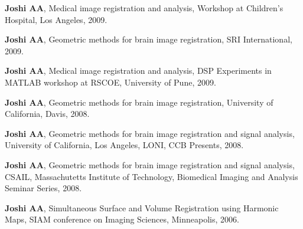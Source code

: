 \documentclass[overlapped,line,letterpaper]{res}
\begin{document}
\begin{resume}
\textbf{Joshi AA}, Medical image registration and analysis, Workshop at Children's Hospital, Los Angeles, 2009.

\textbf{Joshi AA}, Geometric methods for brain image registration, SRI International, 2009. 

\textbf{Joshi AA}, Medical image registration and analysis, DSP Experiments in MATLAB workshop at RSCOE, University of Pune, 2009.

\textbf{Joshi AA}, Geometric methods for brain image registration, University of California, Davis, 2008.

\textbf{Joshi AA}, Geometric methods for brain image registration and signal analysis, University of California, Los Angeles, LONI, CCB Presents, 2008.

\textbf{Joshi AA}, Geometric methods for brain image registration and signal analysis, CSAIL, Massachutetts Institute of Technology, Biomedical Imaging and Analysis Seminar Series, 2008.

\textbf{Joshi AA}, Simultaneous Surface and Volume Registration using Harmonic Maps, SIAM conference on Imaging Sciences, Minneapolis, 2006.






\end{resume}
\end{document}
